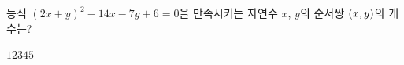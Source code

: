 등식 $(2x+y)^2-14x-7y+6=0$을 만족시키는 자연수 $x$, $y$의 순서쌍 $(x{,}\mkern3mu y)$의 개수는?
\begin{choices32}{$1$}{$2$}{$3$}{$4$}{$5$}\end{choices32}
